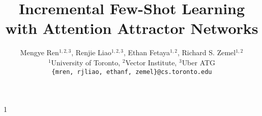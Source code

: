 \documentclass{article}
\newcommand{\ourmodel}{Attention Attractor Networks}
\newcommand{\ourproblem}{Incremental Few-Shot Learning}
\def\arxiv{1}
\begin{document}
\title{{\ourproblem} with {\ourmodel}}
\author{Mengye Ren$^{1,2,3}$, Renjie Liao$^{1,2,3}$, Ethan Fetaya$^{1,2}$, Richard S. Zemel$^{1,2}$\\
${}^1$University of Toronto, ${}^2$Vector Institute, ${}^3$Uber ATG\\
\texttt{\{mren, rjliao, ethanf, zemel\}@cs.toronto.edu}}
\maketitle
\vspace{-0.2in}

\vspace{-0.1in}






{


}
\appendix
\if\arxiv1

\fi
\end{document}

